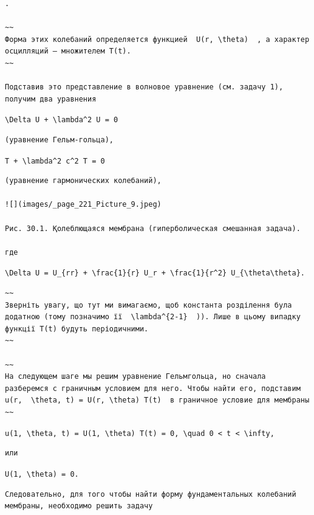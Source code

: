\documentclass[
  ukrainian,
]{article}
\begin{document}
\begin{verbatim}
.

~~
Форма этих колебаний определяется функцией  U(r, \theta)  , а характер осцилляций — множителем T(t).
~~

Подставив это представление в волновое уравнение (см. задачу 1), получим два уравнения
\end{verbatim}

\texttt{\textbackslash{}Delta\ U\ +\ \textbackslash{}lambda\^{}2\ U\ =\ 0}

\begin{verbatim}
(уравнение Гельм-гольца),
\end{verbatim}

\texttt{T\textquotesingle{}\textquotesingle{}\ +\ \textbackslash{}lambda\^{}2\ c\^{}2\ T\ =\ 0}

\begin{verbatim}
(уравнение гармонических колебаний),

![](images/_page_221_Picture_9.jpeg)

Рис. 30.1. Қолеблющаяся мембрана (гиперболическая смешанная задача).

где
\end{verbatim}

\texttt{\textbackslash{}Delta\ U\ =\ U\_\{rr\}\ +\ \textbackslash{}frac\{1\}\{r\}\ U\_r\ +\ \textbackslash{}frac\{1\}\{r\^{}2\}\ U\_\{\textbackslash{}theta\textbackslash{}theta\}.}

\begin{verbatim}
~~
Зверніть увагу, що тут ми вимагаємо, щоб константа розділення була додатною (тому позначимо її  \lambda^{2-1}  )). Лише в цьому випадку функції T(t) будуть періодичними.
~~

~~
На следующем шаге мы решим уравнение Гельмгольца, но сначала разберемся с граничным условием для него. Чтобы найти его, подставим  u(r,  \theta, t) = U(r, \theta) T(t)  в граничное условие для мембраны
~~
\end{verbatim}

\texttt{u(1,\ \textbackslash{}theta,\ t)\ =\ U(1,\ \textbackslash{}theta)\ T(t)\ =\ 0,\ \textbackslash{}quad\ 0\ \textless{}\ t\ \textless{}\ \textbackslash{}infty,}

\begin{verbatim}
или
\end{verbatim}

\texttt{U(1,\ \textbackslash{}theta)\ =\ 0.}

\begin{verbatim}
Следовательно, для того чтобы найти форму фундаментальных колебаний мембраны, необходимо решить задачу
\end{verbatim}
\end{document}
